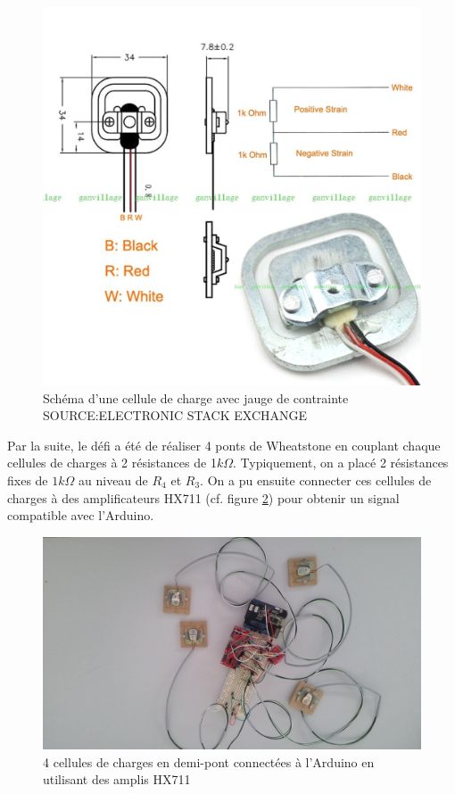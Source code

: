 \documentclass{polytech/polytech}
\begin{document}
\begin{figure}
\begin{center}
\includegraphics[width=12cm]{image/load_sensor.jpg}
\end{center}
\caption{Schéma d'une cellule de charge avec jauge de contrainte SOURCE:ELECTRONIC STACK EXCHANGE}
\label{fig:load_sensor}
\end{figure}

Par la suite, le défi a été de réaliser 4 ponts de Wheatstone en couplant chaque cellules de charges à 2 résistances de 1$k\Omega$. Typiquement, on a placé 2 résistances fixes de $1k\Omega$ au niveau de $R_4$ et $R_3$.  On a pu ensuite connecter ces cellules de charges à des amplificateurs HX711 (cf. figure \ref{fig:load_sensor_connected}) pour obtenir un signal compatible avec l'Arduino.

\begin{figure}
\begin{center}
\includegraphics[width=12cm]{image/load_sensor_connected.jpg}
\end{center}
\caption{4 cellules de charges en demi-pont connectées à l'Arduino en utilisant des amplis HX711}
\label{fig:load_sensor_connected}
\end{figure}
\end{document}
